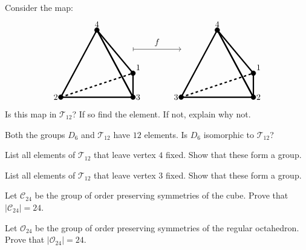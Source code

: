 \documentclass{ximera}
\begin{document}
\begin{exercise}
  Consider the map:
  \[
  \begin{tikzpicture}
  \draw[ultra thick,rounded corners=.05mm] (0,0) -- (3,0) -- (1.5,2.8) -- cycle;
  \draw[ultra thick,rounded corners=.05mm] (3,1) -- (3,0) -- (1.5,2.8) -- cycle;
  \draw[ultra thick,dashed] (0,0) -- (3,1);
  \draw[fill] (3,1) circle (1mm) node[above right] {$1$};
  \draw[fill] (0,0) circle (1mm) node[left] {$2$};
  \draw[fill] (3,0) circle (1mm) node[right] {$3$};
  \draw[fill] (1.5,2.8) circle (1mm) node[above] {$4$};

  \draw[|->] (3,2) -- (5,2);
  \node[above] at (4,2) {$f$};
  
  \draw[ultra thick,rounded corners=.05mm] (5,0) -- (8,0) -- (6.5,2.8) -- cycle;
  \draw[ultra thick,rounded corners=.05mm] (8,1) -- (8,0) -- (6.5,2.8) -- cycle;
  \draw[ultra thick,dashed] (5,0) -- (8,1);
  \draw[fill] (8,1) circle (1mm) node[above right] {$1$};
  \draw[fill] (5,0) circle (1mm) node[left] {$3$};
  \draw[fill] (8,0) circle (1mm) node[right] {$2$};
  \draw[fill] (6.5,2.8) circle (1mm) node[above] {$4$};
  \end{tikzpicture}
  \]
  Is this map in $\mathcal{T}_{12}$? If so find the element. If not, explain why
  not.
\end{exercise}

\begin{exercise}
  Both the groups $D_6$ and $\mathcal{T}_{12}$ have $12$ elements. Is
  $D_6$ isomorphic to $\mathcal{T}_{12}$?
\end{exercise}



\begin{exercise}
  List all elements of $\mathcal{T}_{12}$ that leave vertex $4$
  fixed. Show that these form a group.
\end{exercise}

\begin{exercise}
  List all elements of $\mathcal{T}_{12}$ that leave vertex $3$
  fixed. Show that these form a group.
\end{exercise}

\begin{exercise}\label{E:symcube}
  Let $\mathcal{C}_{24}$ be the group of order preserving symmetries
  of the cube. Prove that $|\mathcal{C}_{24}| = 24$.
\end{exercise}

\begin{exercise}\label{E:symoct}
  Let $\mathcal{O}_{24}$ be the group of order preserving symmetries
  of the regular octahedron. Prove that $|\mathcal{O}_{24}|= 24$.
\end{exercise}
\end{document}
